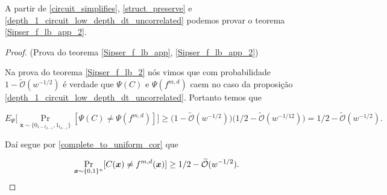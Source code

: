 A partir de \ref{circuit_simplifies}, \ref{struct_preserve} e \ref{depth_1_circuit_low_depth_dt_uncorrelated} podemos provar o teorema \ref{Sipser_f_lb_app_2}.

\begin{proof} (Prova do teorema \ref{Sipser_f_lb_app}, \ref{Sipser_f_lb_app_2})

Na prova do teorema \ref{Sipser_f_lb_2} nós vimos que com probabilidade $1 - \widetilde{\mathcal{O}}(w^{-1/2})$ é verdade que $\Psi(C)$ e $\Psi(f^{m, d})$ caem no caso da proposição \ref{depth_1_circuit_low_depth_dt_uncorrelated}. Portanto temos que

\begin{equation*}
    E_{\Psi}\bigg[ \Pr_{\boldsymbol{x} \sim \{0_{1 - t_{d - 1}}, 1_{t_{d - 1}}\}}[\Psi(C) \neq \Psi(f^{m, d})] \bigg] \geq \Big( 1 - \widetilde{\mathcal{O}}(w^{-1/ 2}) \Big) \Big( 1/2 - \widetilde{\mathcal{O}}(w^{-1/12}) \Big) = 1/2 - \widetilde{\mathcal{O}}(w^{-1/2}).
\end{equation*}

Daí segue por \ref{complete_to_uniform_cor} que

\begin{equation*}
    \Pr_{\boldsymbol{x} \sim \{0, 1\}^{n}}[C(\boldsymbol{x}) \neq f^{m, d}(\boldsymbol{x})] \geq 1/2 - \widetilde{\mathcal{O}}(w^{-1/2}).
\end{equation*}

\end{proof}